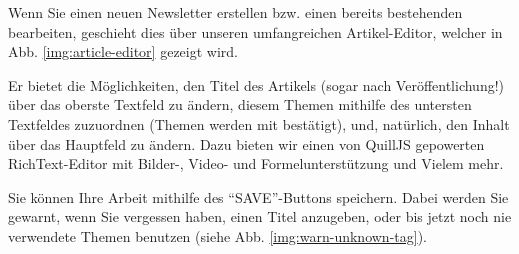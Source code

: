 Wenn Sie einen neuen Newsletter erstellen bzw.
einen bereits bestehenden bearbeiten,
geschieht dies über unseren umfangreichen Artikel-Editor,
welcher in Abb. \ref{img:article-editor} gezeigt wird.


Er bietet die Möglichkeiten,
den Titel des Artikels (sogar nach Veröffentlichung!)
über das oberste Textfeld zu ändern,
diesem Themen mithilfe des untersten Textfeldes zuzuordnen
(Themen werden mit  bestätigt),
und, natürlich,
den Inhalt über das Hauptfeld zu ändern.
Dazu bieten wir einen von QuillJS gepowerten RichText-Editor
mit Bilder-, Video- und Formelunterstützung und Vielem mehr.

Sie können Ihre Arbeit mithilfe des ``SAVE''-Buttons speichern.
Dabei werden Sie gewarnt,
wenn Sie vergessen haben,
einen Titel anzugeben,
oder bis jetzt noch nie verwendete Themen benutzen
(siehe Abb. \ref{img:warn-unknown-tag}).

